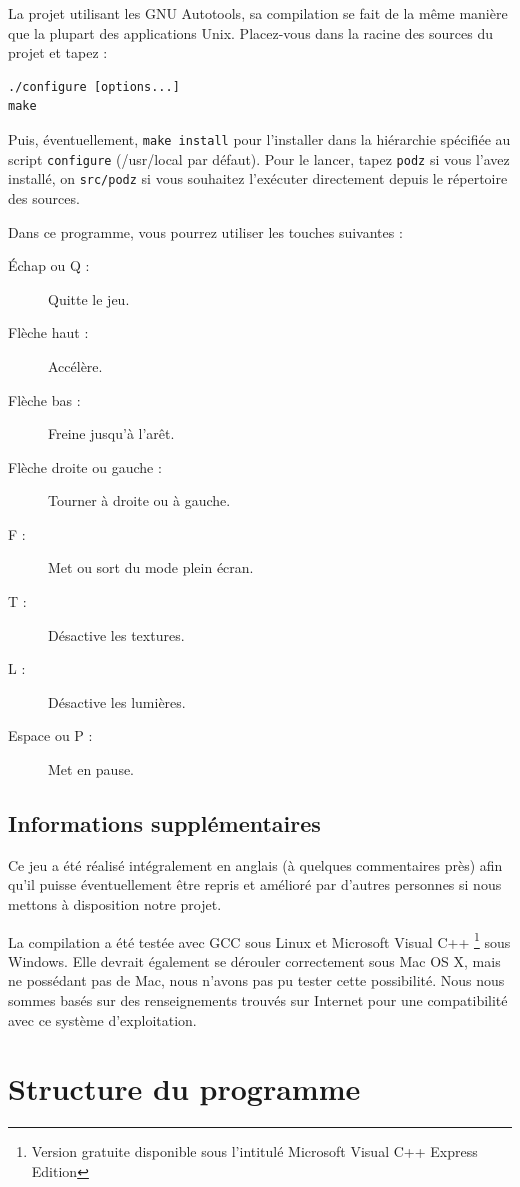 \documentclass[a4paper,11pt]{report}
\newcommand{\ensp}[1]{\selectlanguage{english}#1\selectlanguage{french}}
\newcommand{\file}[1]{\ensp{\textsf{#1}}}
\begin{document}
La projet utilisant les GNU Autotools, sa compilation se fait de la même
manière que la plupart des applications Unix. Placez-vous dans la racine des
sources du projet et tapez :

\begin{verbatim}
./configure [options...]
make
\end{verbatim}

Puis, éventuellement, \verb!make install! pour l'installer dans la hiérarchie
spécifiée au script \verb!configure! (\file{/usr/local} par défaut). Pour le
lancer, tapez \verb!podz! si vous l'avez installé, on \verb!src/podz! si vous
souhaitez l'exécuter directement depuis le répertoire des sources.

\bigskip
Dans ce programme, vous pourrez utiliser les touches suivantes :
\begin{description}
	\item[Échap ou Q :] Quitte le jeu.
	\item[Flèche haut :] Accélère.
	\item[Flèche bas :] Freine jusqu'à l'arêt.
	\item[Flèche droite ou gauche :] Tourner à droite ou à gauche.
	\item[F :] Met ou sort du mode plein écran.
	\item[T :] Désactive les textures.
	\item[L :] Désactive les lumières.
	\item[Espace ou P :] Met en pause.
\end{description}

\section{Informations supplémentaires}

Ce jeu a été réalisé intégralement en anglais (à quelques commentaires près)
afin qu'il puisse éventuellement être repris et amélioré par d'autres
personnes si nous mettons à disposition notre projet.

La compilation a été testée avec GCC sous Linux et Microsoft Visual C++%
\footnote{Version gratuite disponible sous l'intitulé \og Microsoft Visual C++
Express Edition\fg} sous Windows. Elle devrait également se dérouler
correctement sous Mac OS X, mais ne possédant pas de Mac, nous n'avons pas pu
tester cette possibilité. Nous nous sommes basés sur des renseignements
trouvés sur Internet pour une compatibilité avec ce système d'exploitation.


\chapter{Structure du programme}
\end{document}
